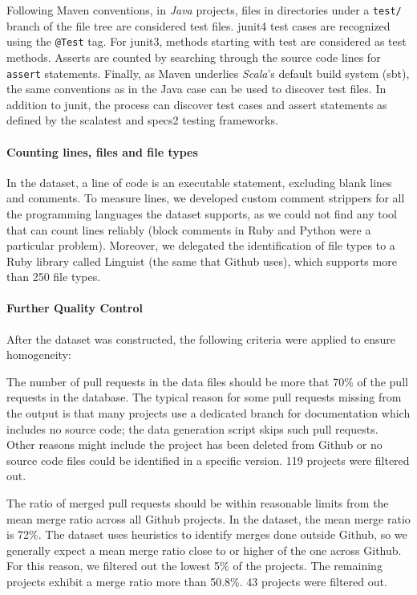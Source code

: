 \documentclass{sig-alternate}
\begin{document}
Following Maven conventions, in \emph{Java} projects, files in directories under
a \texttt{test/} branch of the file tree are considered test files.
\textsf{junit4} test cases are recognized using the \texttt{@Test} tag. For
\textsf{junit3}, methods starting with test are considered as test methods.
Asserts are counted by searching through the source code lines for
\texttt{assert} statements. Finally, as Maven underlies \emph{Scala}'s default
build system (\textsf{sbt}), the same conventions as in the Java case can be
used to discover test files. In addition to \textsf{junit}, the process can
discover test cases and assert statements as defined by the \textsf{scalatest}
and \textsf{specs2} testing frameworks.


\paragraph*{Counting lines, files and file types}

In the \pullreqs dataset, a line of code is an executable statement,
excluding blank lines and comments. To measure lines, we developed custom
comment strippers for all the programming languages the dataset supports, as
we could not find any tool that can count lines reliably (block comments in Ruby and Python were a particular problem).
Moreover, we delegated the identification of file types to a Ruby library
called Linguist (the same that Github uses), which supports more than 250 file types.

\paragraph*{Further Quality Control}
After the dataset was constructed, the following criteria were applied to 
ensure homogeneity:

\begin{compactitem}

  \item The number of pull requests in the data files should be more
    that 70\% of the pull requests in the database.
    The typical reason for some pull requests missing from the output
    is that many projects use a dedicated branch for documentation which
    includes no source code; the data generation script skips such pull
    requests. Other reasons might include the project has been deleted from
    Github or no source code files could be identified in a specific version. 
    119 projects were filtered out.

  \item The ratio of merged pull requests should be within reasonable limits
    from the mean merge ratio across all Github projects. In the \ghtorrent
    dataset, the mean merge ratio is 72\%. The \pullreqs dataset uses heuristics
    to identify merges done outside Github, so we generally expect a mean merge
    ratio close to or higher of the one across Github. For this reason, 
    we filtered out the lowest 5\% of the projects. The remaining projects
    exhibit a merge ratio more than 50.8\%. 43 projects were filtered out.

\end{compactitem}
\end{document}
